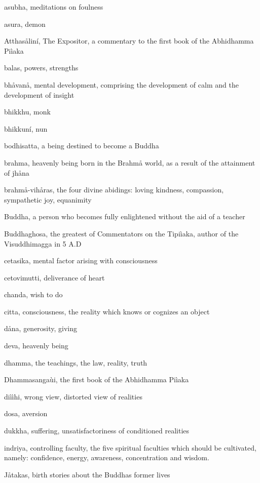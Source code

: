 \documentclass[12pt,twoside]{article}
\begin{document}
asubha, meditations on foulness

asura, demon

Atthas{\aa}lin\'i, The Expositor, a commentary to the first book of the
Abhidhamma Pi\`iaka

balas, powers, strengths

bh{\aa}van{\aa}, mental development, comprising the development of calm
and the development of insight

bhikkhu, monk

bhikkun\'i, nun

bodhisatta, a being destined to become a Buddha

brahma, heavenly being born in the Brahm{\aa} world, as a result of the
attainment of jh{\aa}na

brahm{\aa}{}-vih{\aa}ras, the four divine abidings: loving kindness,
compassion, sympathetic joy, equanimity

Buddha, a person who becomes fully enlightened without the aid of a
teacher

Buddhaghosa, the greatest of Commentators on the Tipi\`iaka, author of
the Visuddhimagga in 5 A.D

cetasika, mental factor arising with consciousness

cetovimutti, {\textasciigrave}{\textasciigrave}deliverance of
heart{\textquotesingle}{\textquotesingle}

chanda, {\textasciigrave}{\textasciigrave}wish to
do{\textquotesingle}{\textquotesingle}

citta, consciousness, the reality which knows or cognizes an object

d{\aa}na, generosity, giving

deva, heavenly being

dhamma, the teachings, the law, reality, truth 

Dhammasanga\`ui, the first book of the Abhidhamma Pi\`iaka

di\`i\`ihi, wrong view, distorted view of realities

dosa, aversion 

dukkha, suffering, unsatisfactoriness of conditioned realities

indriya, controlling faculty, the five {\textasciigrave}spiritual
faculties{\textquotesingle} which should be cultivated, namely:
confidence, energy, awareness, concentration and wisdom.

J{\aa}takas, birth stories about the Buddha{\textquotesingle}s former
lives
\end{document}
